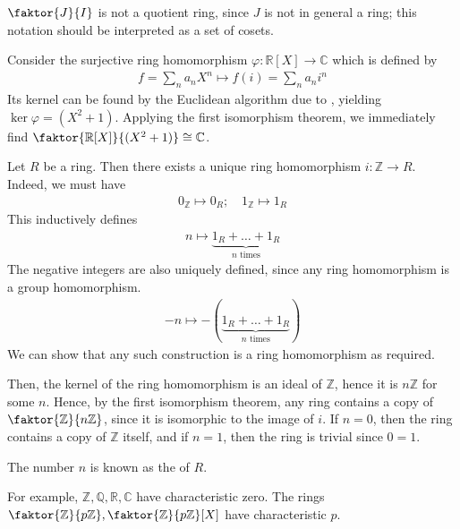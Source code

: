 \begin{remark}
	$\faktor{J}{I}$ is not a quotient ring, since $J$ is not in general a ring; this notation should be interpreted as a set of cosets.
\end{remark}

\begin{example}
	Consider the surjective ring homomorphism $\varphi : \mathbb R[X] \to \mathbb C$ which is defined by
	\begin{align*}
		f = \sum_n a_n X^n \mapsto f(i) = \sum_n a_n i^n
	\end{align*}
	Its kernel can be found by the Euclidean algorithm due to , yielding $\ker \varphi = (X^2 + 1)$.
	Applying the first isomorphism theorem, we immediately find $\faktor{\mathbb R[X]}{(X^2 + 1)} \cong \mathbb C$.
\end{example}

\begin{example}
	Let $R$ be a ring.
	Then there exists a unique ring homomorphism $i : \mathbb Z \to R$.
	Indeed, we must have
	\begin{align*}
		0_{\mathbb Z} \mapsto 0_R;\quad 1_{\mathbb Z} \mapsto 1_R
	\end{align*}
	This inductively defines
	\begin{align*}
		n \mapsto \underbrace{1_R + \dots + 1_R}_{n \text{ times}}
	\end{align*}
	The negative integers are also uniquely defined, since any ring homomorphism is a group homomorphism.
	\begin{align*}
		-n \mapsto -(\underbrace{1_R + \dots + 1_R}_{n \text{ times}})
	\end{align*}
	We can show that any such construction is a ring homomorphism as required.

	Then, the kernel of the ring homomorphism is an ideal of $\mathbb Z$, hence it is $n\mathbb Z$ for some $n$.
	Hence, by the first isomorphism theorem, any ring contains a copy of $\faktor{\mathbb Z}{n\mathbb Z}$, since it is isomorphic to the image of $i$.
	If $n = 0$, then the ring contains a copy of $\mathbb Z$ itself, and if $n = 1$, then the ring is trivial since $0 = 1$.
\end{example}

\begin{definition}[Characteristic]
	The number $n$ is known as the  of $R$.
\end{definition} 

\begin{example}
	For example, $\mathbb Z, \mathbb Q, \mathbb R, \mathbb C$ have characteristic zero.
	The rings $\faktor{\mathbb Z}{p \mathbb Z}, \faktor{\mathbb Z}{p \mathbb Z}[X]$ have characteristic $p$.
\end{example} 

